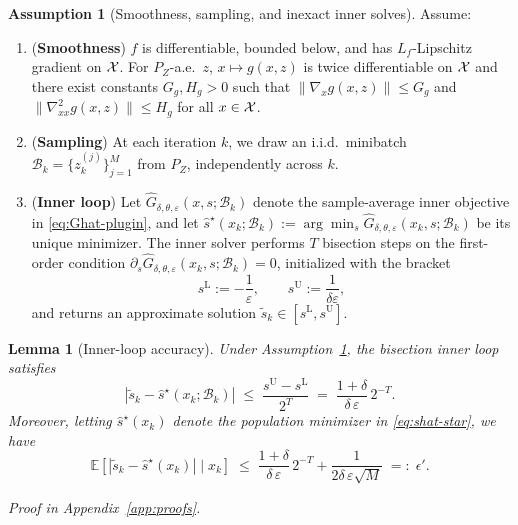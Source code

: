 \documentclass{uai2026} %
\theoremstyle{plain}
\newtheorem{lemma}{Lemma}
\theoremstyle{definition}
\newtheorem{assumption}{Assumption}
\begin{document}
\begin{assumption}[Smoothness, sampling, and inexact inner solves]\label{ass:stoch}
Assume:
\begin{enumerate}
  \item (\textbf{Smoothness}) $f$ is differentiable, bounded below, and has $L_f$-Lipschitz gradient on $\mathcal{X}$.
  For $P_Z$-a.e.\ $z$, $x\mapsto g(x,z)$ is twice differentiable on $\mathcal{X}$ and there exist constants $G_g,H_g>0$ such that
  $\|\nabla_x g(x,z)\|\le G_g$ and $\|\nabla^2_{xx} g(x,z)\|\le H_g$ for all $x\in\mathcal{X}$.
  \item (\textbf{Sampling}) At each iteration $k$, we draw an i.i.d.\ minibatch $\mathcal{B}_k=\{z_k^{(j)}\}_{j=1}^M$ from $P_Z$, independently across $k$.
  \item (\textbf{Inner loop}) Let $\widehat G_{\delta,\theta,\varepsilon}(x,s;\mathcal{B}_k)$ denote the sample-average inner objective in \eqref{eq:Ghat-plugin}, and let
  $\widehat s^\star(x_k;\mathcal{B}_k):=\arg\min_s \widehat G_{\delta,\theta,\varepsilon}(x_k,s;\mathcal{B}_k)$ be its unique minimizer.
  The inner solver performs $T$ bisection steps on the first-order condition $\partial_s\widehat G_{\delta,\theta,\varepsilon}(x_k,s;\mathcal{B}_k)=0$, initialized with the bracket
  \begin{equation}
    s^{\mathrm{L}}:=-\frac{1}{\varepsilon},
    \qquad
    s^{\mathrm{U}}:=\frac{1}{\delta\varepsilon},\label{eq:inner-bracket}
  \end{equation}
  and returns an approximate solution $\tilde s_k\in[s^{\mathrm{L}},s^{\mathrm{U}}]$.
\end{enumerate}
\end{assumption}

\begin{lemma}[Inner-loop accuracy]\label{lem:inner-accuracy}
Under Assumption~\ref{ass:stoch}, the bisection inner loop satisfies
\begin{equation}
  |\tilde s_k-\widehat s^\star(x_k;\mathcal{B}_k)|
  \;\le\;
  \frac{s^{\mathrm{U}}-s^{\mathrm{L}}}{2^T}
  \;=\;
  \frac{1+\delta}{\delta\,\varepsilon}\,2^{-T}.\label{eq:inner-bisect-rate}
\end{equation}
Moreover, letting $\widehat s^\star(x_k)$ denote the population minimizer in \eqref{eq:shat-star}, we have
\begin{equation}
  \mathbb{E}\!\left[|\tilde s_k-\widehat s^\star(x_k)|\mid x_k\right]
  \;\le\;
  \frac{1+\delta}{\delta\,\varepsilon}\,2^{-T}
  + \frac{1}{2\delta\,\varepsilon\sqrt{M}}
  \;=:\;\epsilon'.\label{eq:inner-eps-s}
\end{equation}
\end{lemma}
\emph{Proof in Appendix~\ref{app:proofs}.}
\end{document}
